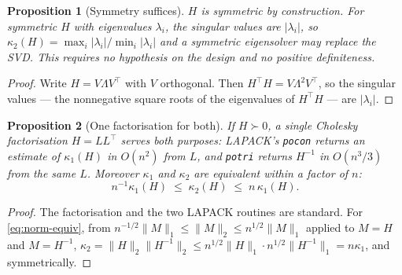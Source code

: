\documentclass[11pt,a4paper]{article}
\theoremstyle{plain}
\newtheorem{proposition}{Proposition}
\theoremstyle{definition}
\newcommand{\cond}{\kappa}
\begin{document}
\begin{proposition}[Symmetry suffices]\label{prop:eigh}
$H$ is symmetric by construction. For symmetric $H$ with eigenvalues $\lambda_i$, the singular
values are $|\lambda_i|$, so $\cond_2(H) = \max_i|\lambda_i| / \min_i|\lambda_i|$ and a symmetric
eigensolver may replace the SVD. This requires no hypothesis on the design and no positive
definiteness.
\end{proposition}

\begin{proof}
Write $H = V\Lambda V^\top$ with $V$ orthogonal. Then $H^\top H = V\Lambda^2V^\top$, so the
singular values --- the nonnegative square roots of the eigenvalues of $H^\top H$ --- are
$|\lambda_i|$.
\end{proof}

\begin{proposition}[One factorisation for both]\label{prop:chol}
If $H \succ 0$, a single Cholesky factorisation $H = LL^\top$ serves both purposes: LAPACK's
\texttt{pocon} returns an estimate of $\cond_1(H)$ in $O(n^2)$ from $L$, and \texttt{potri}
returns $H^{-1}$ in $O(n^3/3)$ from the same $L$. Moreover $\cond_1$ and $\cond_2$ are equivalent
within a factor of $n$:
\begin{equation}\label{eq:norm-equiv}
  n^{-1}\cond_1(H) \;\le\; \cond_2(H) \;\le\; n\,\cond_1(H).
\end{equation}
\end{proposition}

\begin{proof}
The factorisation and the two LAPACK routines are standard. For \eqref{eq:norm-equiv}, from
$n^{-1/2}\|M\|_1 \le \|M\|_2 \le n^{1/2}\|M\|_1$ applied to $M = H$ and $M = H^{-1}$,
$\cond_2 = \|H\|_2\|H^{-1}\|_2 \le n^{1/2}\|H\|_1 \cdot n^{1/2}\|H^{-1}\|_1 = n\cond_1$, and
symmetrically.
\end{proof}
\end{document}
